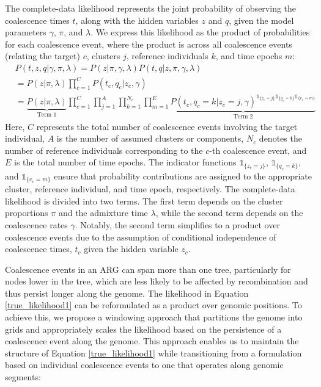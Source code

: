 The complete-data likelihood represents the joint probability of observing the coalescence times \( t \), along with the hidden variables \( z \) and \( q \), given the model parameters \( \gamma \), \( \pi \), and \( \lambda \). We express this likelihood as the product of probabilities for each coalescence event, where the product is across all coalescence events (relating the target) \( c \), clusters \( j \), reference individuals \( k \), and time epochs \( m \):
\begin{align}
    &P (t,z,q \vert \gamma, \pi, \lambda) = P(z \vert \pi, \gamma, \lambda) P (t,q \vert z, \pi, \gamma, \lambda) \nonumber \\
    &= P(z \vert \pi, \lambda) \prod_{c=1}^{C} P (t_c,q_c \vert z_c, \gamma) \nonumber \\
    &= \underbrace{P(z \vert \pi, \lambda)}_{\text{Term 1}} \prod_{c=1}^{C} \prod_{j = 1}^A \prod_{k =1}^{N_c} \prod_{m = 1}^E \underbrace{P (t_c,q_c=k \vert z_c = j, \gamma)^{\mathds{1}_{\{z_c = j\}} \mathds{1}_{\{q_c = k\}} \mathds{1}_{\{e_c = m\}}}}_{\text{Term 2}}
\label{true_likelihood1}
\end{align}
Here, \( C \) represents the total number of coalescence events involving the target individual, \( A \) is the number of assumed clusters or components, \( N_c \) denotes the number of reference individuals corresponding to the \( c \)-th coalescence event, and \( E \) is the total number of time epochs. The indicator functions \( \mathds{1}_{\{z_c = j\}} \), \( \mathds{1}_{\{q_c = k\}} \), and \( \mathds{1}_{\{e_c = m\}} \) ensure that probability contributions are assigned to the appropriate cluster, reference individual, and time epoch, respectively. The complete-data likelihood is divided into two terms. The first term depends on the cluster proportions \( \pi \) and the admixture time \( \lambda \), while the second term depends on the coalescence rates \( \gamma \). Notably, the second term simplifies to a product over coalescence events due to the assumption of conditional independence of coalescence times, $t_c$ given the hidden variable \( z_c \).

Coalescence events in an ARG can span more than one tree, particularly for nodes lower in the tree, which are less likely to be affected by recombination and thus persist longer along the genome. The likelihood in Equation \ref{true_likelihood1} can be reformulated as a product over genomic positions. To achieve this, we propose a windowing approach that partitions the genome into grids and appropriately scales the likelihood based on the persistence of a coalescence event along the genome. This approach enables us to maintain the structure of Equation \ref{true_likelihood1} while transitioning from a formulation based on individual coalescence events to one that operates along genomic segments:

